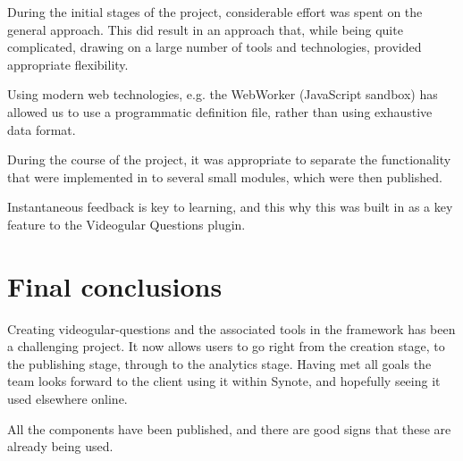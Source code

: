 During the initial stages of the project, considerable effort was spent on the general approach. This did result in an approach that, while being quite complicated, drawing on a large number of tools and technologies, provided appropriate flexibility.

Using modern web technologies, e.g. the WebWorker (JavaScript sandbox) has allowed us to use a programmatic definition file, rather than using exhaustive data format.

During the course of the project, it was appropriate to separate the functionality that were implemented in to several small modules, which were then published.

Instantaneous feedback is key to learning, and this why this was built in as a key feature to the Videogular Questions plugin.

\section{Final conclusions}

Creating videogular-questions and the associated tools in the framework has been a challenging project. It now allows users to go right from the creation
stage, to the publishing stage, through to the analytics stage. Having met all goals the team looks forward to the client using it within Synote, and hopefully seeing it used elsewhere online.

All the components have been published, and there are good signs that these are already being used.


